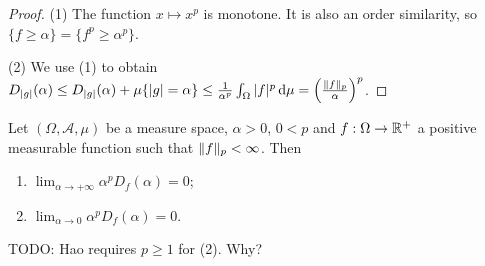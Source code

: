 \begin{proof}
(1) The function $x\mapsto x^p$ is monotone. It is also an order similarity, so $\{f \geq \alpha\} = \{f^p \geq \alpha^p\}$.

(2) We use (1) to obtain $D_{|g|}(\alpha) \leq D_{|g|}(\alpha) + \mu\{|g| = \alpha\} \leq \frac{1}{\alpha^p}\int_\Omega |f|^p\operatorname{d \!}{\mu} = \left(\frac{\lVert f\rVert_p}{\alpha}\right)^p$.
\end{proof}
\begin{corollary}
Let $(\Omega, \mathcal{A}, \mu)$ be a measure space, $\alpha>0$, $0<p$ and $f:\Omega\to\mathbb{R}^+$ a positive measurable function such that $\lVert f\rVert_p < \infty$. Then
\begin{enumerate}
\item $\lim_{\alpha \to +\infty}\alpha^p D_f(\alpha) = 0$;
\item $\lim_{\alpha \to 0}\alpha^p D_f(\alpha) = 0$.
\end{enumerate}
\end{corollary}
TODO: Hao requires $p\geq 1$ for (2). Why?
